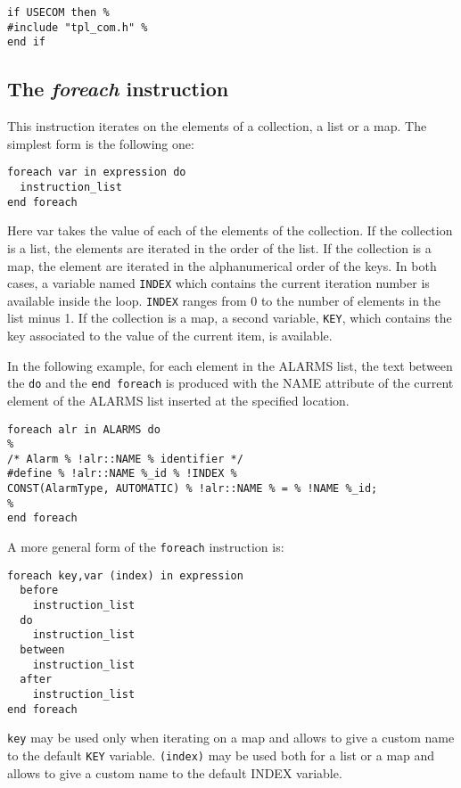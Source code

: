 \documentclass[11pt]{article}
\newcommand{\var}[1]{{\small\ttfamily #1}}
\begin{document}
{\begin{lstlisting}
if USECOM then %
#include "tpl_com.h" %
end if
\end{lstlisting}

\subsection{The {\em foreach} instruction}

This instruction iterates on the elements of a collection, a list or a map. The simplest form is the following one:

\begin{lstlisting}
foreach var in expression do
  instruction_list
end foreach
\end{lstlisting}

Here var takes the value of each of the elements of the collection. If the collection is a list, the elements are iterated in the order of the list. If the collection is a map, the element are iterated in the alphanumerical order of the keys. In both cases, a variable named \lstinline{INDEX} which contains the current iteration number is available inside the loop. \lstinline{INDEX} ranges from 0 to the number of elements in the list minus 1. If the collection is a map, a second variable, \lstinline{KEY}, which contains the key associated to the value of the current item, is available.

In the following example, for each element in the \var{ALARMS} list, the text between the \lstinline{do} and the \lstinline{end foreach} is produced with the \var{NAME} attribute of the current element of the \var{ALARMS} list inserted at the specified location.

\begin{lstlisting}
foreach alr in ALARMS do
%
/* Alarm % !alr::NAME % identifier */
#define % !alr::NAME %_id % !INDEX %
CONST(AlarmType, AUTOMATIC) % !alr::NAME % = % !NAME %_id;
%
end foreach
\end{lstlisting}

A more general form of the \lstinline{foreach} instruction is:

\begin{lstlisting}
foreach key,var (index) in expression
  before
    instruction_list
  do 
    instruction_list
  between
    instruction_list
  after 
    instruction_list
end foreach
\end{lstlisting}

\texttt{key} may be used only when iterating on a map and allows to give a custom name to the default \lstinline{KEY} variable. \lstinline{(index)} may be used both for a list or a map and allows to give a custom name to the default \var{INDEX} variable.

}
\end{document}
